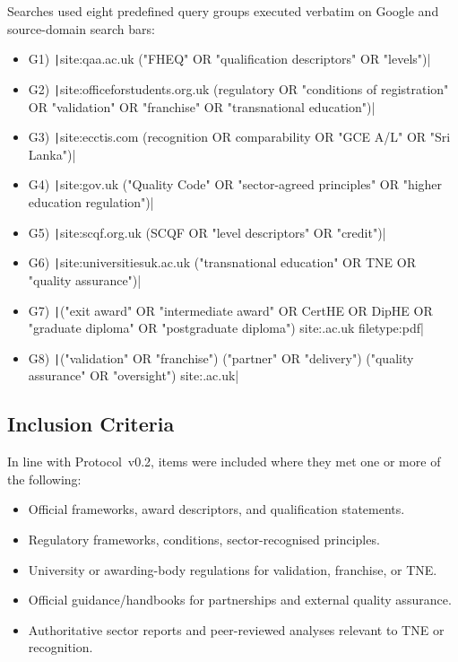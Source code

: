 Searches used eight predefined query groups executed verbatim on Google and source-domain search bars:

\begin{itemize}
    \item G1) \texttt|site:qaa.ac.uk ("FHEQ" OR "qualification descriptors" OR "levels")|
    \item G2) \texttt|site:officeforstudents.org.uk (regulatory OR "conditions of registration" OR "validation" OR "franchise" OR "transnational education")|
    \item G3) \texttt|site:ecctis.com (recognition OR comparability OR "GCE A/L" OR "Sri Lanka")|
    \item G4) \texttt|site:gov.uk ("Quality Code" OR "sector-agreed principles" OR "higher education regulation")|
    \item G5) \texttt|site:scqf.org.uk (SCQF OR "level descriptors" OR "credit")|
    \item G6) \texttt|site:universitiesuk.ac.uk ("transnational education" OR TNE OR "quality assurance")|
    \item G7) \texttt|("exit award" OR "intermediate award" OR CertHE OR DipHE OR "graduate diploma" OR "postgraduate diploma") site:.ac.uk filetype:pdf|
    \item G8) \texttt|("validation" OR "franchise") ("partner" OR "delivery") ("quality assurance" OR "oversight") site:.ac.uk|
\end{itemize}

\subsection{Inclusion Criteria}

In line with Protocol~v0.2, items were included where they met one or more of the following:

\begin{itemize}
    \item Official frameworks, award descriptors, and qualification statements.
    \item Regulatory frameworks, conditions, sector-recognised principles.
    \item University or awarding-body regulations for validation, franchise, or TNE.
    \item Official guidance/handbooks for partnerships and external quality assurance.
    \item Authoritative sector reports and peer-reviewed analyses relevant to TNE or recognition.
\end{itemize}

